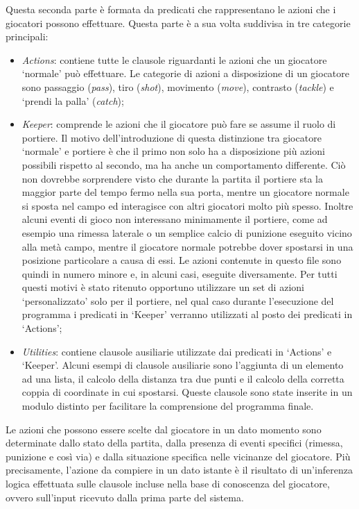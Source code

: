 Questa seconda parte \`{e} formata da predicati che rappresentano le azioni che i giocatori possono effettuare. Questa parte \`{e} a sua volta suddivisa in tre categorie principali:
\begin{itemize}
\item \emph{Actions}: contiene tutte le clausole riguardanti le azioni che un giocatore `normale' pu\`{o} effettuare. Le categorie di azioni a disposizione di un giocatore sono passaggio (\emph{pass}), tiro (\emph{shot}), movimento (\emph{move}), contrasto (\emph{tackle}) e `prendi la palla' (\emph{catch}); 
\item \emph{Keeper}: comprende le azioni che il giocatore pu\`{o} fare se assume il ruolo di portiere. Il motivo dell'introduzione di questa distinzione tra giocatore `normale' e portiere \`{e}  che il primo non solo ha a disposizione pi\`{u}  azioni possibili rispetto al secondo, ma ha anche un comportamento differente. Ci\`{o}  non dovrebbe sorprendere visto che durante la partita il portiere sta la maggior parte del tempo fermo nella sua porta, mentre un giocatore normale si sposta nel campo ed interagisce con altri giocatori molto pi\`{u}  spesso. Inoltre alcuni eventi di gioco non interessano minimamente il portiere, come ad esempio una rimessa laterale o un semplice calcio di punizione eseguito vicino alla met\`{a}  campo, mentre il giocatore normale potrebbe dover spostarsi in una posizione particolare a causa di essi. Le azioni contenute in questo file sono quindi in numero minore e, in alcuni casi, eseguite diversamente. Per tutti questi motivi \`{e}  stato ritenuto opportuno utilizzare un set di azioni `personalizzato' solo per il portiere, nel qual caso durante l'esecuzione del programma i predicati in `Keeper' verranno utilizzati al posto dei predicati in `Actions';
\item \emph{Utilities}: contiene clausole ausiliarie utilizzate dai predicati in `Actions' e `Keeper'. Alcuni esempi di clausole ausiliarie sono l'aggiunta di un elemento ad una lista, il calcolo della distanza tra due punti e il calcolo della corretta coppia di coordinate in cui spostarsi. Queste clausole sono state inserite in un modulo distinto per facilitare la comprensione del programma finale.
\end{itemize}
\noindent Le azioni che possono essere scelte dal giocatore in un dato momento sono determinate dallo stato della partita, dalla presenza di eventi specifici (rimessa, punizione e così via) e dalla situazione specifica nelle vicinanze del giocatore. Pi\`{u} precisamente, l'azione da compiere in un dato istante \`{e} il risultato di un'inferenza logica effettuata sulle clausole incluse nella base di conoscenza del giocatore, ovvero sull'input ricevuto dalla prima parte del sistema.

